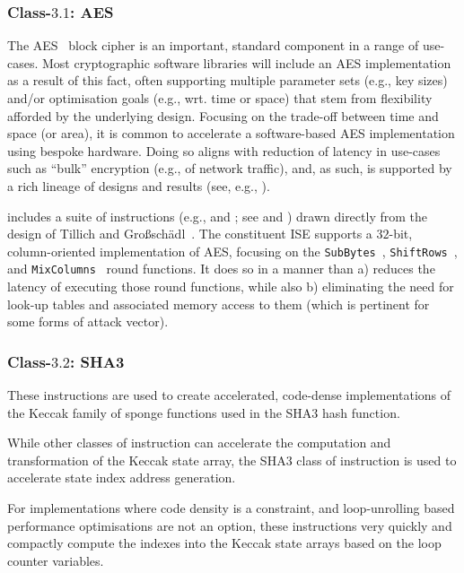 
\subsubsection{Class-$3.1$: AES}
\label{sec:bg:feature:3:1}

The 
AES~\cite{SCARV:FIPS:197} 
block cipher is an important, standard component in a range of use-cases.  
Most cryptographic software libraries will include an AES implementation 
as a result of this fact, often supporting multiple 
parameter sets     (e.g., key sizes)
and/or
optimisation goals (e.g., wrt. time or space)
that stem from flexibility afforded by the underlying design.
Focusing on the trade-off between time and space (or area), it is common
to accelerate a software-based AES implementation using bespoke hardware.
Doing so aligns with reduction of latency in use-cases such as ``bulk''
encryption (e.g., of network traffic), and, as such, is supported by a
rich lineage of designs and results (see, e.g., ).

\XCID includes a suite of instructions 
(e.g.,  and ; see  and )
drawn directly from the design of
Tillich and Gro{\ss}sch\"{a}dl~\cite{SCARV:TilGro:06}.
The constituent ISE supports a $32$-bit, column-oriented implementation 
of AES, focusing on the
{\tt SubBytes}~\cite[Section 5.1.1]{SCARV:FIPS:197},
{\tt ShiftRows}~\cite[Section 5.1.2]{SCARV:FIPS:197}, 
and
{\tt MixColumns}~\cite[Section 5.1.3]{SCARV:FIPS:197}
round functions.  It does so in a manner than 
a) reduces the latency of executing those round functions, 
   while also
b) eliminating the need for look-up tables and associated memory access
   to them (which is pertinent for some forms of attack vector).


\subsubsection{Class-$3.2$: SHA3}
\label{sec:bg:feature:3:2}

These instructions are used to create accelerated, code-dense implementations
of the Keccak family of sponge functions used in the SHA3 hash function.

While other classes of \XCID instruction can accelerate the computation
and transformation of the Keccak state array, the SHA3 class of instruction
is used to accelerate state index address generation.

For implementations where code density is a constraint, and loop-unrolling
based performance optimisations are not an option, these instructions
very quickly and compactly compute the indexes into the Keccak state arrays
based on the loop counter variables.

